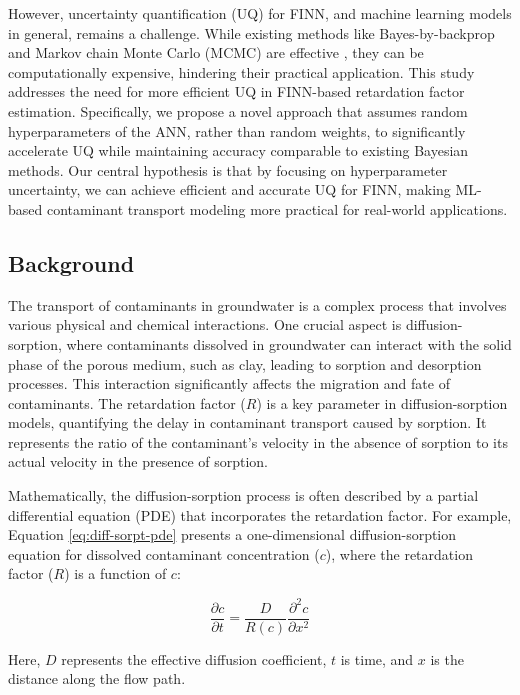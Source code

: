 \documentclass{article}
\begin{document}
However, uncertainty quantification (UQ) for FINN, and machine learning models in general, remains a challenge. While existing methods like Bayes-by-backprop and Markov chain Monte Carlo (MCMC) are effective \cite{finn}, they can be computationally expensive, hindering their practical application. This study addresses the need for more efficient UQ in FINN-based retardation factor estimation. Specifically, we propose a novel approach that assumes random hyperparameters of the ANN, rather than random weights, to significantly accelerate UQ while maintaining accuracy comparable to existing Bayesian methods. Our central hypothesis is that by focusing on hyperparameter uncertainty, we can achieve efficient and accurate UQ for FINN, making ML-based contaminant transport modeling more practical for real-world applications.


\subsection{Background}
The transport of contaminants in groundwater is a complex process that involves various physical and chemical interactions. One crucial aspect is diffusion-sorption, where contaminants dissolved in groundwater can interact with the solid phase of the porous medium, such as clay, leading to sorption and desorption processes. This interaction significantly affects the migration and fate of contaminants.
The retardation factor ($R$) is a key parameter in diffusion-sorption models, quantifying the delay in contaminant transport caused by sorption. It represents the ratio of the contaminant's velocity in the absence of sorption to its actual velocity in the presence of sorption.

Mathematically, the diffusion-sorption process is often described by a partial differential equation (PDE) that incorporates the retardation factor. For example, Equation \eqref{eq:diff-sorpt-pde} presents a one-dimensional diffusion-sorption equation for dissolved contaminant concentration ($c$), where the retardation factor ($R$) is a function of $c$:

\begin{equation}
    \frac{\partial c}{\partial t} = \frac{D}{R(c)} \frac{\partial^2 c}{\partial x^2}
    \label{eq:diff-sorpt-pde}
\end{equation}

Here, $D$ represents the effective diffusion coefficient, $t$ is time, and $x$ is the distance along the flow path.
\end{document}
